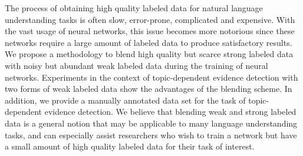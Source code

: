 The process of obtaining high quality labeled data for natural language understanding tasks is often slow, error-prone, complicated and expensive. With the vast usage of neural networks, this issue becomes more notorious since these networks require a large amount of labeled data to produce satisfactory results. We propose a methodology to blend high quality but scarce strong labeled data with noisy but abundant weak labeled data during the training of neural networks. Experiments in the context of topic-dependent evidence detection with two forms of weak labeled data show the advantages of the blending scheme. In addition, we provide a manually annotated data set for the task of topic-dependent evidence detection. We believe that blending weak and strong labeled data is a general notion that may be applicable to many language understanding tasks, and can especially assist researchers who wish to train a network but have a small amount of high quality labeled data for their task of interest.
